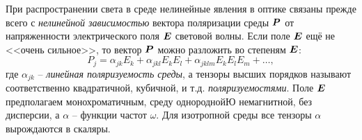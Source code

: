 
При распространении света в среде нелинейные явления в оптике связаны прежде всего с \textit{нелинейной зависимостью} вектора поляризации среды $\mbox{\boldmath $P$}$ от напряженности электрического поля $\mbox{\boldmath $E$}$ световой волны. Если поле $\mbox{\boldmath $E$}$ ещё не <<очень сильное>>, то вектор $\mbox{\boldmath $P$}$ можно разложить во степеням $\mbox{\boldmath $E$}$:
\begin{equation*}
    P_j = \alpha_{jk} E_k + \alpha_{jkl} E_k E_l + \alpha_{jklm} E_k E_l E_m + \ldots, 
\end{equation*}
где $\alpha_{jk}$ -- \textit{линейная поляризуемость среды}, а тензоры высших порядков называют соответственно квадратичной, кубичной, и т.д. \textit{поляризуемостями}. Поле $\mbox{\boldmath $E$}$ предполагаем монохроматичным, среду однороднойЮ немагнитной, без дисперсии, а $\alpha$ -- функции частот $\omega$. Для изотропной среды все тензоры $\alpha$ вырождаются в скаляры. 



